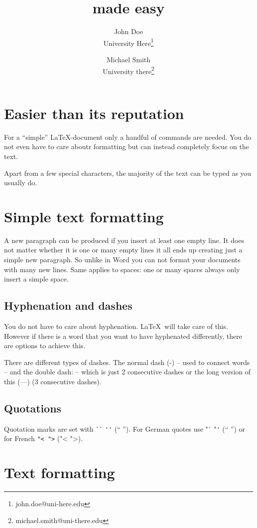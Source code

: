 \documentclass[11pt, a4paper]{article}
\title{\ltx{} made easy}
\author{John Doe\\ University Here\thanks{john.doe@uni-here.edu} \and Michael Smith\\University there\thanks{michael.smith@uni-there.edu}}
\newcommand{\ltx}{\LaTeX}
\begin{document}
\maketitle
\tableofcontents
\newpage

\section{Easier than its reputation}

For a ``simple'' \ltx-document only a handful of commands are needed. You do not even have to care aboutr formatting but can instead completely focus on the text.

Apart from a few special characters, the majority of the text can be typed as you usually do.

\section{Simple text formatting}

A new paragraph can be produced if you insert at least one empty line. It does not matter whether it is one or many empty lines it all ends up creating just a simple new paragraph. So unlike in Word you can not format your documents with many new lines. Same applies to spaces: one or many spaces always only insert a simple space.

\subsection{Hyphenation and dashes}

You do not have to care about hyphenation. \ltx\ will take care of this. However if there is a word that you want to have hyphenated differently, there are options to achieve this.

There are different types of dashes. The normal dash (-) -- used to connect words -- and the double dash: -- which is just 2 consecutive dashes or the long version of this (---) (3 consecutive dashes).


\subsection{Quotations}
Quotation marks are set with \`{}\`{} \verb+''+ (`` ''). For German quotes use "\`{} "\verb+'+ ("` "') or for French \verb+"< ">+ ("< ">).

\begingroup
\setlength{\parindent}{0pt}
\setlength{\parskip}{1.5ex plus 0.5ex minus 0.2ex}
\section{Text formatting\label{sec:eftf}}
\end{document}
